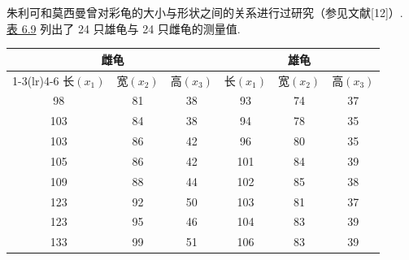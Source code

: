 \medskip
{}\quad 朱利可和莫西曼曾对彩龟的大小与形状之间的关系进行过研究（参见文献[12]）. \hyperref[tab:6.9]{表 6.9} 列出了 24 只雄龟与 24 只雌龟的测量值.

\begin{mvtable}
\label{tab:6.9}
\begin{tabular}{ccc|ccc}
\toprule
\multicolumn{3}{c}{雌龟} & \multicolumn{3}{c}{雄龟} \\
\cmidrule(lr){1-3}\cmidrule(lr){4-6}
长$(x_{1})$ & 宽$(x_{2})$ & 高$(x_{3})$ & 长$(x_{1})$ & 宽$(x_{2})$ & 高$(x_{3})$ \\
\midrule
98 & 81 & 38 & 93 & 74 & 37 \\
103 & 84 & 38 & 94 & 78 & 35 \\
103 & 86 & 42 & 96 & 80 & 35 \\
105 & 86 & 42 & 101 & 84 & 39 \\
109 & 88 & 44 & 102 & 85 & 38 \\
123 & 92 & 50 & 103 & 81 & 37 \\
123 & 95 & 46 & 104 & 83 & 39 \\
133 & 99 & 51 & 106 & 83 & 39 \\
\bottomrule
\end{tabular}
\end{mvtable}
